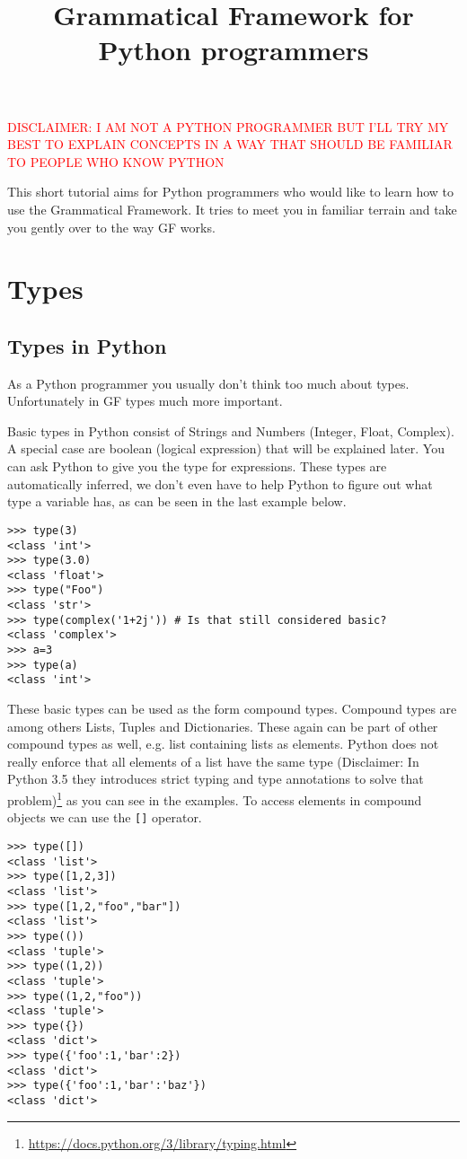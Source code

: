 \documentclass{scrartcl}
\title{Grammatical Framework for Python programmers}
\newcommand{\note}[1]{\textcolor{red}{\uppercase{#1}}}
\begin{document}
\maketitle
\note{disclaimer: i am not a python programmer but i'll try my best to explain concepts in a way that should be familiar to people who know python}

This short tutorial aims for Python programmers who would like to learn how to use the Grammatical Framework. It tries to meet you in familiar terrain and take you gently over to the way GF works.
\section{Types}

\subsection{Types in Python}

As a Python programmer you usually don't think too much about types. Unfortunately in GF types much more important.

Basic types in Python consist of Strings and Numbers (Integer, Float, Complex). A special case are boolean (logical expression) that will be explained later.
You can ask Python to give you the type for expressions. These types are automatically inferred, we don't even have to help Python to figure out what type
a variable has, as can be seen in the last example below.

\begin{verbatim}
>>> type(3)
<class 'int'>
>>> type(3.0)
<class 'float'>
>>> type("Foo")
<class 'str'>
>>> type(complex('1+2j')) # Is that still considered basic?
<class 'complex'>
>>> a=3
>>> type(a)
<class 'int'>
\end{verbatim}

These basic types can be used as the form compound types. Compound types are among others Lists, Tuples and Dictionaries.
These again can be part of other compound types as well, e.g. list containing lists as elements. Python does not really enforce
that all elements of a list have the same type (Disclaimer: In Python 3.5 they introduces strict typing and type annotations to solve that problem)\footnote{\url{https://docs.python.org/3/library/typing.html}} as you can see in the examples. To access elements in compound objects we
can use the \texttt{[]} operator.

\begin{verbatim}
>>> type([])
<class 'list'>
>>> type([1,2,3])
<class 'list'>
>>> type([1,2,"foo","bar"])
<class 'list'>
>>> type(())
<class 'tuple'>
>>> type((1,2))
<class 'tuple'>
>>> type((1,2,"foo"))
<class 'tuple'>
>>> type({})
<class 'dict'>
>>> type({'foo':1,'bar':2})
<class 'dict'>
>>> type({'foo':1,'bar':'baz'})
<class 'dict'>
\end{verbatim}
\end{document}
